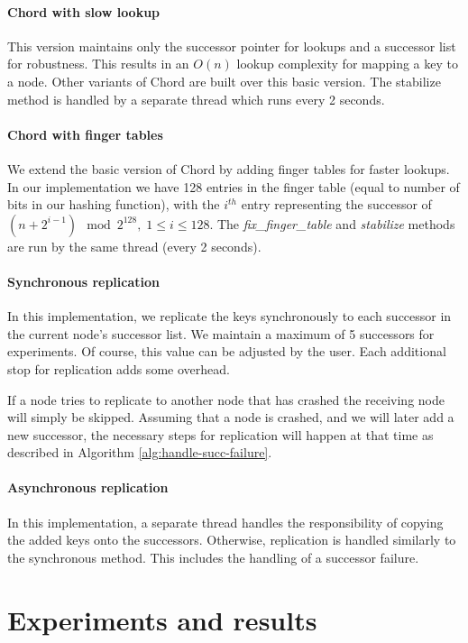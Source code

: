 \documentclass{sig-alternate-10pt}
\begin{document}
\paragraph{Chord with slow lookup}
This version maintains only the successor pointer for lookups and a successor list for robustness. This results in an $O(n)$ lookup complexity for mapping a key to a node. Other variants of Chord are built over this basic version. The stabilize method is handled by a separate thread which runs every 2 seconds.

\paragraph{Chord with finger tables}
We extend the basic version of Chord by adding finger tables for faster lookups. In our implementation we have 128 entries in the finger table (equal to number of bits in our hashing function), with the $i^{th}$ entry representing the successor of $(n + 2^{i - 1}) \mod 2^{128},\; 1 \leq i \leq 128$. The \textit{fix\_finger\_table} and \textit{stabilize} methods are run by the same thread (every 2 seconds).

\paragraph{Synchronous replication}
In this implementation, we replicate the keys synchronously to each successor in the current node's successor list. We maintain a maximum of 5 successors for experiments.  Of course, this value can be adjusted by the user.  Each additional stop for replication adds some overhead.

If a node tries to replicate to another node that has crashed the receiving node will simply be skipped.  Assuming that a node is crashed, and we will later add a new successor, the necessary steps for replication will happen at that time as described in Algorithm \ref{alg:handle-succ-failure}.

\paragraph{Asynchronous replication}
In this implementation, a separate thread handles the responsibility of copying the added keys onto the successors.  Otherwise, replication is handled similarly to the synchronous method.  This includes the handling of a successor failure. 

\section{Experiments and results}
\end{document}
